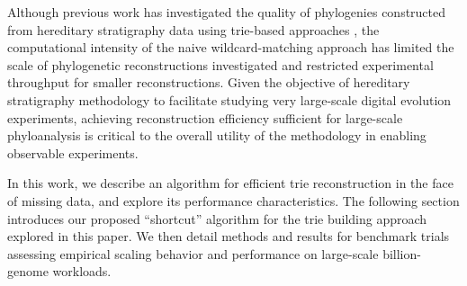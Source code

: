 Although previous work has investigated the quality of phylogenies constructed from hereditary stratigraphy data using trie-based approaches \citep{moreno2025testing}, the computational intensity of the naive wildcard-matching approach has limited the scale of phylogenetic reconstructions investigated and restricted experimental throughput for smaller reconstructions.
Given the objective of hereditary stratigraphy methodology to facilitate studying very large-scale digital evolution experiments, achieving reconstruction efficiency sufficient for large-scale phyloanalysis is critical to the overall utility of the methodology in enabling observable experiments.

In this work, we describe an algorithm for efficient trie reconstruction in the face of missing data, and explore its performance characteristics.
The following section introduces our proposed ``shortcut'' algorithm for the trie building approach explored in this paper.
We then detail methods and results for benchmark trials assessing empirical scaling behavior and performance on large-scale billion-genome workloads.

%





